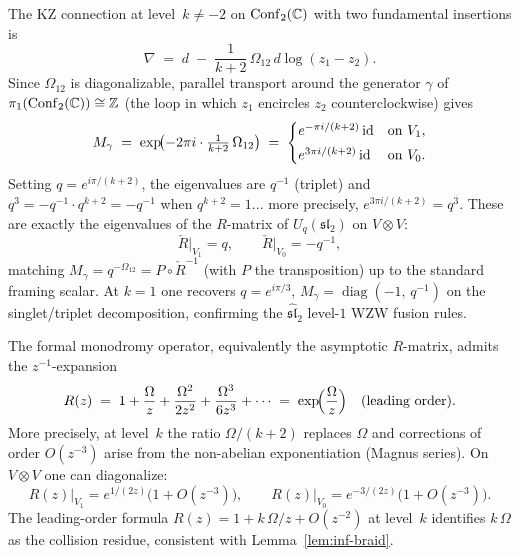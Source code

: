 \begin{computation}
The KZ connection at level~$k\neq -2$ on
$\mathrm{Conf}_2(\mathbb C)$ with two fundamental insertions is
\[
 \nabla \;=\; d \;-\; \frac{1}{k+2}\,\Omega_{12}\,d\log(z_1-z_2).
\]
Since $\Omega_{12}$ is diagonalizable, parallel transport around
the generator $\gamma$ of $\pi_1(\mathrm{Conf}_2(\mathbb C))\cong\mathbb Z$
(the loop in which $z_1$ encircles $z_2$ counterclockwise) gives
\begin{equation}%
 M_\gamma
 \;=\;
 \exp\!\bigl(-2\pi i\cdot\tfrac{1}{k+2}\,\Omega_{12}\bigr)
 \;=\;
 \begin{cases}
 e^{-\pi i/(k+2)}\,\id & \text{on } V_1, \\[3pt]
 e^{3\pi i/(k+2)}\,\id & \text{on } V_0.
 \end{cases}
\end{equation}
Setting $q=e^{i\pi/(k+2)}$, the eigenvalues are $q^{-1}$ (triplet) and $q^3=-q^{-1}\cdot q^{k+2}=-q^{-1}$
when $q^{k+2}=1$... more precisely, $e^{3\pi i/(k+2)}=q^3$.
These are exactly the eigenvalues of the $R$-matrix of $U_q(\mathfrak{sl}_2)$
on $V\otimes V$:
\[
 \check{R}\big|_{V_1}=q,\qquad \check{R}\big|_{V_0}=-q^{-1},
\]
matching $M_\gamma = q^{-\Omega_{12}} = P\circ \check{R}^{-1}$
(with $P$ the transposition) up to the standard framing scalar.
At $k=1$ one recovers $q=e^{i\pi/3}$, $M_\gamma=\operatorname{diag}(-1,\,q^{-1})$
on the singlet/triplet decomposition, confirming the
$\widehat{\mathfrak{sl}}_2$ level-$1$ WZW fusion rules.
\end{computation}

\begin{computation}
The formal monodromy operator, equivalently the asymptotic $R$-matrix,
admits the $z^{-1}$-expansion
\begin{equation}%
 R(z) \;=\; 1 + \frac{\Omega}{z} + \frac{\Omega^2}{2z^2} + \frac{\Omega^3}{6z^3}+\cdots
 \;=\; \exp\!\Bigl(\frac{\Omega}{z}\Bigr)\quad (\text{leading order}).
\end{equation}
More precisely, at level~$k$ the ratio $\Omega/(k+2)$ replaces $\Omega$
and corrections of order $O(z^{-3})$ arise from the non-abelian exponentiation
(Magnus series). On $V\otimes V$ one can diagonalize:
\[
 R(z)\big|_{V_1} = e^{1/(2z)}\bigl(1+O(z^{-3})\bigr),
 \qquad
 R(z)\big|_{V_0} = e^{-3/(2z)}\bigl(1+O(z^{-3})\bigr).
\]
The leading-order formula $R(z)=1+k\,\Omega/z+O(z^{-2})$
at level~$k$ identifies $k\,\Omega$ as the collision residue, consistent with
Lemma~\ref{lem:inf-braid}.
\end{computation}


